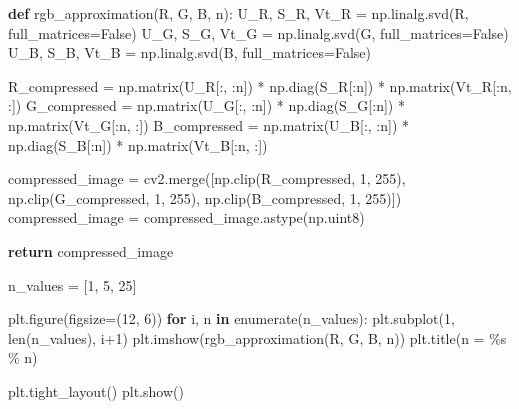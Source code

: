 \documentclass[
  letterpaper,
  DIV=11,
  numbers=noendperiod,
  oneside]{scrartcl}
\newenvironment{Shaded}{\begin{snugshade}}{\end{snugshade}}
\newcommand{\BuiltInTok}[1]{\textcolor[rgb]{0.00,0.23,0.31}{#1}}
\newcommand{\ControlFlowTok}[1]{\textcolor[rgb]{0.00,0.23,0.31}{\textbf{#1}}}
\newcommand{\DecValTok}[1]{\textcolor[rgb]{0.68,0.00,0.00}{#1}}
\newcommand{\KeywordTok}[1]{\textcolor[rgb]{0.00,0.23,0.31}{\textbf{#1}}}
\newcommand{\NormalTok}[1]{\textcolor[rgb]{0.00,0.23,0.31}{#1}}
\newcommand{\OperatorTok}[1]{\textcolor[rgb]{0.37,0.37,0.37}{#1}}
\newcommand{\SpecialCharTok}[1]{\textcolor[rgb]{0.37,0.37,0.37}{#1}}
\newcommand{\StringTok}[1]{\textcolor[rgb]{0.13,0.47,0.30}{#1}}
\newcommand{\VariableTok}[1]{\textcolor[rgb]{0.07,0.07,0.07}{#1}}
\begin{document}
\begin{Shaded}
\begin{Highlighting}[]
\KeywordTok{def}\NormalTok{ rgb\_approximation(R, G, B, n):}
\NormalTok{    U\_R, S\_R, Vt\_R }\OperatorTok{=}\NormalTok{ np.linalg.svd(R, full\_matrices}\OperatorTok{=}\VariableTok{False}\NormalTok{)}
\NormalTok{    U\_G, S\_G, Vt\_G }\OperatorTok{=}\NormalTok{ np.linalg.svd(G, full\_matrices}\OperatorTok{=}\VariableTok{False}\NormalTok{)}
\NormalTok{    U\_B, S\_B, Vt\_B }\OperatorTok{=}\NormalTok{ np.linalg.svd(B, full\_matrices}\OperatorTok{=}\VariableTok{False}\NormalTok{)}

\NormalTok{    R\_compressed }\OperatorTok{=}\NormalTok{ np.matrix(U\_R[:, :n]) }\OperatorTok{*}\NormalTok{ np.diag(S\_R[:n]) }\OperatorTok{*}\NormalTok{ np.matrix(Vt\_R[:n, :])}
\NormalTok{    G\_compressed }\OperatorTok{=}\NormalTok{ np.matrix(U\_G[:, :n]) }\OperatorTok{*}\NormalTok{ np.diag(S\_G[:n]) }\OperatorTok{*}\NormalTok{ np.matrix(Vt\_G[:n, :])}
\NormalTok{    B\_compressed }\OperatorTok{=}\NormalTok{ np.matrix(U\_B[:, :n]) }\OperatorTok{*}\NormalTok{ np.diag(S\_B[:n]) }\OperatorTok{*}\NormalTok{ np.matrix(Vt\_B[:n, :])}

\NormalTok{    compressed\_image }\OperatorTok{=}\NormalTok{ cv2.merge([np.clip(R\_compressed, }\DecValTok{1}\NormalTok{, }\DecValTok{255}\NormalTok{), np.clip(G\_compressed, }\DecValTok{1}\NormalTok{, }\DecValTok{255}\NormalTok{), np.clip(B\_compressed, }\DecValTok{1}\NormalTok{, }\DecValTok{255}\NormalTok{)])}
\NormalTok{    compressed\_image }\OperatorTok{=}\NormalTok{ compressed\_image.astype(np.uint8)}

    \ControlFlowTok{return}\NormalTok{ compressed\_image}

\NormalTok{n\_values }\OperatorTok{=}\NormalTok{ [}\DecValTok{1}\NormalTok{, }\DecValTok{5}\NormalTok{, }\DecValTok{25}\NormalTok{]}

\NormalTok{plt.figure(figsize}\OperatorTok{=}\NormalTok{(}\DecValTok{12}\NormalTok{, }\DecValTok{6}\NormalTok{))}
\ControlFlowTok{for}\NormalTok{ i, n }\KeywordTok{in} \BuiltInTok{enumerate}\NormalTok{(n\_values):}
\NormalTok{    plt.subplot(}\DecValTok{1}\NormalTok{, }\BuiltInTok{len}\NormalTok{(n\_values), i}\OperatorTok{+}\DecValTok{1}\NormalTok{)}
\NormalTok{    plt.imshow(rgb\_approximation(R, G, B, n))}
\NormalTok{    plt.title(}\StringTok{\textquotesingle{}n = }\SpecialCharTok{\%s}\StringTok{\textquotesingle{}} \OperatorTok{\%}\NormalTok{ n)}

\NormalTok{plt.tight\_layout()}
\NormalTok{plt.show()}
\end{Highlighting}
\end{Shaded}
\end{document}
